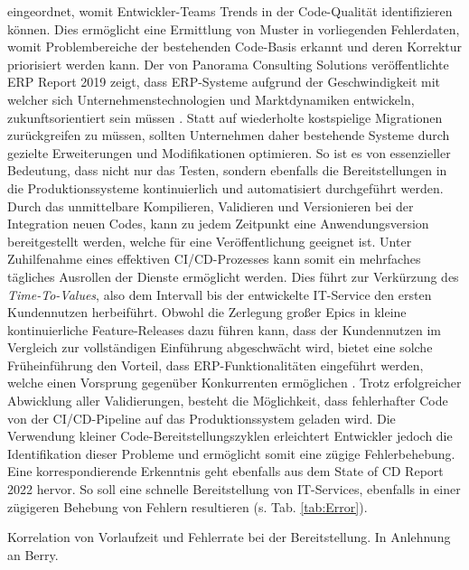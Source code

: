 eingeordnet, womit Entwickler-Teams Trends in der Code-Qualität identifizieren können. Dies ermöglicht eine Ermittlung von Muster in vorliegenden Fehlerdaten, womit Problembereiche der bestehenden Code-Basis erkannt und deren Korrektur priorisiert werden kann. Der von Panorama Consulting Solutions veröffentlichte ERP Report 2019 zeigt, dass ERP-Systeme aufgrund der Geschwindigkeit mit welcher sich Unternehmenstechnologien und Marktdynamiken entwickeln, zukunftsorientiert sein müssen \cite{.c}. Statt auf wiederholte kostspielige Migrationen zurückgreifen zu müssen, sollten Unternehmen daher bestehende Systeme durch gezielte Erweiterungen und Modifikationen optimieren. So ist es von essenzieller Bedeutung, dass nicht nur das Testen, sondern ebenfalls die Bereitstellungen in die Produktionssysteme kontinuierlich und automatisiert durchgeführt werden. Durch das unmittelbare Kompilieren, Validieren und Versionieren bei der Integration neuen Codes, kann zu jedem Zeitpunkt eine Anwendungsversion bereitgestellt werden, welche für eine Veröffentlichung geeignet ist. Unter Zuhilfenahme eines effektiven CI/CD-Prozesses kann somit ein mehrfaches tägliches Ausrollen der Dienste ermöglicht werden. Dies führt zur Verkürzung des \textit{Time-To-Values}, also dem Intervall bis der entwickelte IT-Service den ersten Kundennutzen herbeiführt. Obwohl die Zerlegung großer Epics in kleine kontinuierliche Feature-Releases dazu führen kann, dass der Kundennutzen im Vergleich zur vollständigen Einführung abgeschwächt wird, bietet eine solche Früheinführung den Vorteil, dass ERP-Funktionalitäten eingeführt werden, welche einen Vorsprung gegenüber Konkurrenten ermöglichen \cite[9]{Halstenberg.2020}. Trotz erfolgreicher Abwicklung aller Validierungen, besteht die Möglichkeit, dass fehlerhafter Code von der CI/CD-Pipeline auf das Produktionssystem geladen wird. Die Verwendung kleiner Code-Bereitstellungszyklen erleichtert Entwickler jedoch die Identifikation dieser Probleme und ermöglicht somit eine zügige Fehlerbehebung. Eine korrespondierende Erkenntnis geht ebenfalls aus dem State of CD Report 2022 hervor. So soll eine schnelle Bereitstellung von IT-Services, ebenfalls in einer zügigeren Behebung von Fehlern resultieren (s. Tab. \ref{tab:Error}). 
\begin{center}
	\begin{table}[H]
		\centering
		\caption[Korrelation von Vorlaufzeit und Fehlerrate bei der Bereitstellung]{Korrelation von Vorlaufzeit und Fehlerrate bei der Bereitstellung. In Anlehnung an Berry.}
		\label{tab:Error}
	\end{table}
\end{center}
